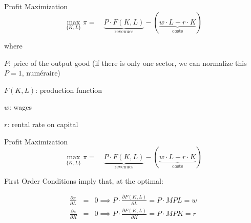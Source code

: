 \documentclass[notes,11pt, aspectratio=169, xcolor=table]{beamer}
\newenvironment{wideitemize}{\itemize\addtolength{\itemsep}{10pt}}{\enditemize}
\begin{document}
\begin{frame}{Profit Maximization}
  \begin{equation*}
    \max_{\{K,L\}} \pi  = \quad \underbrace{P \cdot F(K,L)}_{\text{revenues}} - \left( \underbrace{w \cdot L + r \cdot K}_{\text{costs}} \right)
  \end{equation*}

  \noindent where 
  \begin{wideitemize}
    \item $P$: price of the output good (if there is only one sector, we can normalize this $P=1$, num\'eraire)
    \item $F(K,L)$: production function
    \item $w$: wages
    \item $r$: rental rate on capital
  \end{wideitemize}
  
\end{frame}

\begin{frame}{Profit Maximization}
  \begin{equation*}
    \max_{\{K,L\}} \pi = \quad \underbrace{P \cdot F(K,L)}_{\text{revenues}} - \left( \underbrace{w \cdot L + r \cdot K}_{\text{costs}} \right)
  \end{equation*}

  First Order Conditions imply that, at the optimal:

  \begin{eqnarray*}
    \frac{\partial \pi}{\partial L} &=& 0 \implies P \cdot \frac{\partial F(K,L)}{\partial L} = P \cdot MPL = w \\
    \frac{\partial \pi}{\partial K} &=& 0 \implies P \cdot \frac{\partial F(K,L)}{\partial K} =  P \cdot MPK = r 
  \end{eqnarray*}

\end{frame}
\end{document}
